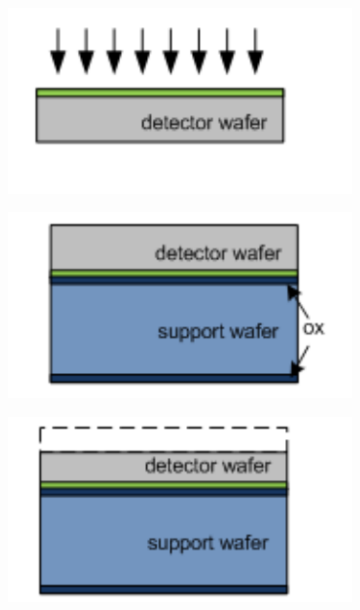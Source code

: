 \begin{figure}[htbp]
  \centering
  \begin{subfigure}[b]{0.3\textwidth}
    \centering
    \includegraphics[width=\textwidth]{figures/ActiveEdge/advacamProcess/wafer_1.pdf}
    \caption{}
  \end{subfigure}\hfill
  \begin{subfigure}[b]{0.3\textwidth}
    \includegraphics[width=\textwidth]{figures/ActiveEdge/advacamProcess/wafer_2.pdf}
    \caption{}
  \end{subfigure}\hfill
  \begin{subfigure}[b]{0.3\textwidth}
    \includegraphics[width=\textwidth]{figures/ActiveEdge/advacamProcess/wafer_3.pdf}
    \caption{}
  \end{subfigure}\\


\end{figure}
